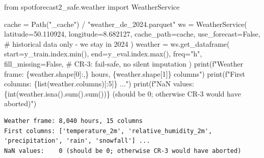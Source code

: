 \documentclass[
  english,
  letterpaper,
]{scrbook}
\newenvironment{Shaded}{\begin{snugshade}}{\end{snugshade}}
\newcommand{\BuiltInTok}[1]{\textcolor[rgb]{0.00,0.23,0.31}{#1}}
\newcommand{\CommentTok}[1]{\textcolor[rgb]{0.37,0.37,0.37}{#1}}
\newcommand{\DecValTok}[1]{\textcolor[rgb]{0.68,0.00,0.00}{#1}}
\newcommand{\FloatTok}[1]{\textcolor[rgb]{0.68,0.00,0.00}{#1}}
\newcommand{\ImportTok}[1]{\textcolor[rgb]{0.00,0.46,0.62}{#1}}
\newcommand{\NormalTok}[1]{\textcolor[rgb]{0.00,0.23,0.31}{#1}}
\newcommand{\OperatorTok}[1]{\textcolor[rgb]{0.37,0.37,0.37}{#1}}
\newcommand{\SpecialCharTok}[1]{\textcolor[rgb]{0.37,0.37,0.37}{#1}}
\newcommand{\SpecialStringTok}[1]{\textcolor[rgb]{0.13,0.47,0.30}{#1}}
\newcommand{\StringTok}[1]{\textcolor[rgb]{0.13,0.47,0.30}{#1}}
\newcommand{\VariableTok}[1]{\textcolor[rgb]{0.07,0.07,0.07}{#1}}
\begin{document}
\protect{}\label{weather-fetch}
\begin{Shaded}
\begin{Highlighting}[]
\ImportTok{from}\NormalTok{ spotforecast2\_safe.weather }\ImportTok{import}\NormalTok{ WeatherService}

\NormalTok{cache }\OperatorTok{=}\NormalTok{ Path(}\StringTok{"\_cache"}\NormalTok{) }\OperatorTok{/} \StringTok{"weather\_de\_2024.parquet"}
\NormalTok{ws }\OperatorTok{=}\NormalTok{ WeatherService(}
\NormalTok{    latitude}\OperatorTok{=}\FloatTok{50.110924}\NormalTok{,}
\NormalTok{    longitude}\OperatorTok{=}\FloatTok{8.682127}\NormalTok{,}
\NormalTok{    cache\_path}\OperatorTok{=}\NormalTok{cache,}
\NormalTok{    use\_forecast}\OperatorTok{=}\VariableTok{False}\NormalTok{,         }\CommentTok{\# historical data only {-} we stay in 2024}
\NormalTok{)}
\NormalTok{weather }\OperatorTok{=}\NormalTok{ ws.get\_dataframe(}
\NormalTok{    start}\OperatorTok{=}\NormalTok{y\_train.index.}\BuiltInTok{min}\NormalTok{(),}
\NormalTok{    end}\OperatorTok{=}\NormalTok{y\_eval.index.}\BuiltInTok{max}\NormalTok{(),}
\NormalTok{    freq}\OperatorTok{=}\StringTok{"h"}\NormalTok{,}
\NormalTok{    fill\_missing}\OperatorTok{=}\VariableTok{False}\NormalTok{,         }\CommentTok{\# CR{-}3: fail{-}safe, no silent imputation}
\NormalTok{)}
\BuiltInTok{print}\NormalTok{(}\SpecialStringTok{f"Weather frame: }\SpecialCharTok{\{}\NormalTok{weather}\SpecialCharTok{.}\NormalTok{shape[}\DecValTok{0}\NormalTok{]}\SpecialCharTok{:,\}}\SpecialStringTok{ hours, }\SpecialCharTok{\{}\NormalTok{weather}\SpecialCharTok{.}\NormalTok{shape[}\DecValTok{1}\NormalTok{]}\SpecialCharTok{\}}\SpecialStringTok{ columns"}\NormalTok{)}
\BuiltInTok{print}\NormalTok{(}\SpecialStringTok{f"First columns: }\SpecialCharTok{\{}\BuiltInTok{list}\NormalTok{(weather.columns)[:}\DecValTok{5}\NormalTok{]}\SpecialCharTok{\}}\SpecialStringTok{ ..."}\NormalTok{)}
\BuiltInTok{print}\NormalTok{(}\SpecialStringTok{f"NaN values:    }\SpecialCharTok{\{}\BuiltInTok{int}\NormalTok{(weather.isna().}\BuiltInTok{sum}\NormalTok{().}\BuiltInTok{sum}\NormalTok{())}\SpecialCharTok{\}}\SpecialStringTok{ (should be 0; otherwise CR{-}3 would have aborted)"}\NormalTok{)}
\end{Highlighting}
\end{Shaded}

\begin{verbatim}
Weather frame: 8,040 hours, 15 columns
First columns: ['temperature_2m', 'relative_humidity_2m', 'precipitation', 'rain', 'snowfall'] ...
NaN values:    0 (should be 0; otherwise CR-3 would have aborted)
\end{verbatim}
\end{document}
